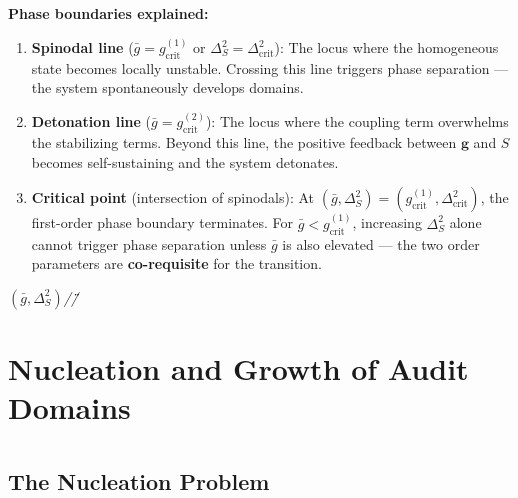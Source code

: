 \documentclass[12pt,a4paper]{article}
\theoremstyle{plain}
\theoremstyle{definition}
\newcommand{\gf}{\mathbf{g}}          %
\newcommand{\Sf}{S}                   %
\newcommand{\gbar}{\bar{g}}           %
\newcommand{\cn}[1]{\textcolor{scxgray}{\textit{#1}}}
\begin{document}
\textbf{Phase boundaries explained:}
\begin{enumerate}[label=(\arabic*)]
    \item \textbf{Spinodal line} ($\gbar = g_{\text{crit}}^{(1)}$ or $\Delta_S^2 = \Delta_{\text{crit}}^2$):
          The locus where the homogeneous state becomes locally unstable.
          Crossing this line triggers phase separation — the system spontaneously
          develops domains.

    \item \textbf{Detonation line} ($\gbar = g_{\text{crit}}^{(2)}$):
          The locus where the coupling term overwhelms the stabilizing terms.
          Beyond this line, the positive feedback between $\gf$ and $\Sf$
          becomes self-sustaining and the system detonates.

    \item \textbf{Critical point} (intersection of spinodals):
          At $(\gbar,\Delta_S^2) = (g_{\text{crit}}^{(1)}, \Delta_{\text{crit}}^2)$,
          the first-order phase boundary terminates. For $\gbar < g_{\text{crit}}^{(1)}$,
          increasing $\Delta_S^2$ alone cannot trigger phase separation unless
          $\gbar$ is also elevated — the two order parameters are \textbf{co-requisite}
          for the transition.
\end{enumerate}

\bigskip
\noindent
\cn{$(\gbar,\Delta_S^2)$//\"\"}

\section{Nucleation and Growth of Audit Domains}
\section*{}

\subsection{The Nucleation Problem}
\subsection*{}
\end{document}
